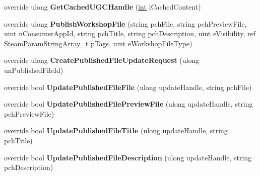 \begin{DoxyCompactItemize}
\item 
\hypertarget{classValve_1_1Steamworks_1_1CSteamRemoteStorage_ac6ece91c2dec37f5135d7e723c15f532}{}override ulong {\bfseries Get\+Cached\+U\+G\+C\+Handle} (\hyperlink{SDL__thread_8h_a6a64f9be4433e4de6e2f2f548cf3c08e}{int} i\+Cached\+Content)\label{classValve_1_1Steamworks_1_1CSteamRemoteStorage_ac6ece91c2dec37f5135d7e723c15f532}

\item 
\hypertarget{classValve_1_1Steamworks_1_1CSteamRemoteStorage_a5be4146cef1209c8d48b29cfdf12d2d4}{}override ulong {\bfseries Publish\+Workshop\+File} (string pch\+File, string pch\+Preview\+File, uint n\+Consumer\+App\+Id, string pch\+Title, string pch\+Description, uint e\+Visibility, ref \hyperlink{structValve_1_1Steamworks_1_1SteamParamStringArray__t}{Steam\+Param\+String\+Array\+\_\+t} p\+Tags, uint e\+Workshop\+File\+Type)\label{classValve_1_1Steamworks_1_1CSteamRemoteStorage_a5be4146cef1209c8d48b29cfdf12d2d4}

\item 
\hypertarget{classValve_1_1Steamworks_1_1CSteamRemoteStorage_a0a21362d76e87874751e87c0ba1ab6fe}{}override ulong {\bfseries Create\+Published\+File\+Update\+Request} (ulong un\+Published\+File\+Id)\label{classValve_1_1Steamworks_1_1CSteamRemoteStorage_a0a21362d76e87874751e87c0ba1ab6fe}

\item 
\hypertarget{classValve_1_1Steamworks_1_1CSteamRemoteStorage_a1c46b5a6c69b54434beb298bd547f9e0}{}override bool {\bfseries Update\+Published\+File\+File} (ulong update\+Handle, string pch\+File)\label{classValve_1_1Steamworks_1_1CSteamRemoteStorage_a1c46b5a6c69b54434beb298bd547f9e0}

\item 
\hypertarget{classValve_1_1Steamworks_1_1CSteamRemoteStorage_a08e37642b03b3d9bbf0a4a8a425c8107}{}override bool {\bfseries Update\+Published\+File\+Preview\+File} (ulong update\+Handle, string pch\+Preview\+File)\label{classValve_1_1Steamworks_1_1CSteamRemoteStorage_a08e37642b03b3d9bbf0a4a8a425c8107}

\item 
\hypertarget{classValve_1_1Steamworks_1_1CSteamRemoteStorage_adca84ba955e8e433ae1794df082f232a}{}override bool {\bfseries Update\+Published\+File\+Title} (ulong update\+Handle, string pch\+Title)\label{classValve_1_1Steamworks_1_1CSteamRemoteStorage_adca84ba955e8e433ae1794df082f232a}

\item 
\hypertarget{classValve_1_1Steamworks_1_1CSteamRemoteStorage_a35fc01293cac99a06c7e779fbf548944}{}override bool {\bfseries Update\+Published\+File\+Description} (ulong update\+Handle, string pch\+Description)\label{classValve_1_1Steamworks_1_1CSteamRemoteStorage_a35fc01293cac99a06c7e779fbf548944}


\end{DoxyCompactItemize}
